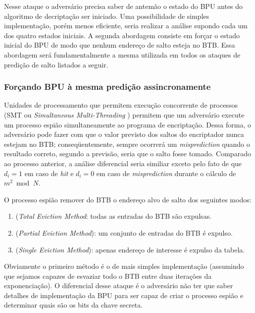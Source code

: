 Nesse ataque o advers\'{a}rio precisa saber de antem\~{a}o o estado do BPU antes do algoritmo de decripta\c{c}\~{a}o ser iniciado. Uma possibilidade de simples implementa\c{c}\~{a}o, por\'{e}m menos eficiente, seria realizar a an\'{a}lise supondo cada um dos quatro estados iniciais. A segunda abordagem consiste em for\c{c}ar o estado inicial do BPU de modo que nenhum endere\c{c}o de salto esteja no BTB. Essa abordagem ser\'{a} fundamentalmente a mesma utilizada em todos os ataques de predi\c{c}\~{a}o de salto listados a seguir.

\subsubsection{For\c{c}ando BPU \`{a} mesma predi\c{c}\~{a}o assincronamente}

Unidades de processamento que permitem execu\c{c}\~{a}o concorrente de processos (SMT ou \textit{Simultaneous Multi-Threading} \cite{Silberschatz2004}) permitem que um advers\'{a}rio execute um processo espi\~{a}o simultaneamente ao programa de encripta\c{c}\~{a}o. Dessa forma, o advers\'{a}rio pode fazer com que o valor previsto dos saltos do encriptador nunca estejam no BTB; conseq\"{u}entemente, sempre ocorrer\'{a} um \textit{misprediction} quando o resultado correto, segundo a previs\~{a}o, seria que o salto fosse tomado. Comparado ao processo anterior, a an\'{a}lise diferencial seria similiar exceto pelo fato de que $d_{i} = 1$ em caso de \textit{hit} e $d_{i} = 0$ em caso de \textit{misprediction} durante o c\'{a}lculo de $m^{2} \bmod N$.

O processo espi\~{a}o remover do BTB o endere\c{c}o alvo de salto dos seguintes modos:
\begin{enumerate}
	\item (\textit{Total Eviction Method}: todas as entradas do BTB s\~{a}o expulsas.
	\item (\textit{Partial Eviction Method}): um conjunto de entradas do BTB \'{e} expulso.
	\item (\textit{Single Eviction Method}): apenas endere\c{c}o de interesse \'{e} expulso da tabela.
\end{enumerate}

Obviamente o primeiro m\'{e}todo \'{e} o de mais simples implementa\c{c}\~{a}o (assumindo que sejamos capazes de esvaziar todo o BTB entre duas itera\c{c}\~{o}es da exponencia\c{c}\~{a}o). O diferencial desse ataque \'{e} o advers\'{a}rio n\~{a}o ter que saber detalhes de implementa\c{c}\~{a}o da BPU para ser capaz de criar o processo espi\~{a}o e determinar quais s\~{a}o os bits da chave secreta.

